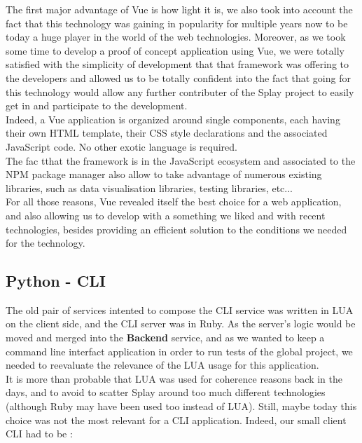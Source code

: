 \documentclass{eplmastersthesis}
\begin{document}
        The first major advantage of Vue is how light it is, we also took into
        account the fact that this technology was gaining in popularity for
        multiple years now to be today a huge player in the world of the web
        technologies. Moreover, as we took some time to develop a proof
        of concept application using Vue, we were totally satisfied with the
        simplicity of development that that framework was offering to the
        developers and allowed us to be totally confident into the fact
        that going for this technology would allow any further contributer
        of the Splay project to easily get in and participate to the
        development.\\
        Indeed, a Vue application is organized around single components, each
        having their own HTML template, their CSS style declarations and
        the associated JavaScript code. No other exotic language is required.\\
        The fac tthat the framework is in the JavaScript ecosystem and
        associated to the NPM package manager also allow to take advantage of
        numerous existing libraries, such as data visualisation libraries,
        testing libraries, etc... \\

        For all those reasons, Vue revealed itself the best choice for a
        web application, and also allowing us to develop with a something
        we liked and with recent technologies, besides providing an efficient
        solution to the conditions we needed for the technology.

      \subsection{Python - CLI}

        The old pair of services intented to compose the CLI service was
        written in LUA on the client side, and the CLI server was in Ruby. As
        the server's logic would be moved and merged into the \textbf{Backend}
        service, and as we wanted to keep a command line interfact application
        in order to run tests of the global project, we needed to reevaluate
        the relevance of the LUA usage for this application.\\

        It is more than probable that LUA was used for coherence reasons back
        in the days, and to avoid to scatter Splay around too much different
        technologies (although Ruby may have been used too instead of LUA).
        Still, maybe today this choice was not the most relevant for a CLI
        application. Indeed, our small client CLI had to be :
\end{document}
